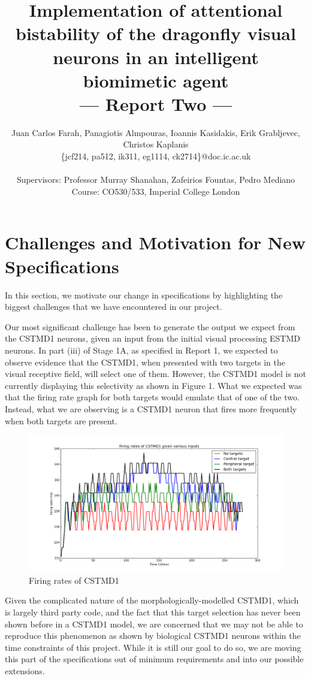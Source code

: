 \documentclass[a4paper,11pt]{article}
\title{Implementation of attentional bistability of the dragonfly visual neurons in an intelligent biomimetic agent\\\Large{--- Report Two ---}}
\author{Juan Carlos Farah, Panagiotis Almpouras, Ioannis Kasidakis, Erik Grabljevec, Christos Kaplanis\\
       \{jcf214, pa512, ik311, eg1114, ck2714\}@doc.ic.ac.uk\\ \\
       \small{Supervisors: Professor Murray Shanahan, Zafeirios Fountas, Pedro Mediano}\\
       \small{Course: CO530/533, Imperial College London}
}
\begin{document}
\maketitle
\section{Challenges and Motivation for New Specifications}
In this section, we motivate our change in specifications by highlighting the biggest challenges that we have encountered in our project. 

Our most significant challenge has been to generate the output we expect from the CSTMD1 neurons, given an input from the initial visual processing ESTMD neurons. In part (iii) of Stage 1A, as specified in Report 1, we expected to observe evidence that the CSTMD1, when presented with two targets in the visual receptive field, will select one of them. However, the CSTMD1 model is not currently displaying this selectivity as shown in Figure 1. What we expected was that the firing rate graph for both targets would emulate that of one of the two. Instead, what we are observing is a CSTMD1 neuron that fires more frequently when both targets are present.

	\begin{figure}[h]
	\begin{center}
	\includegraphics[scale = 0.3]{firingrates}
	\end{center}
	\caption{Firing rates of CSTMD1}
	\end{figure}	

Given the complicated nature of the morphologically-modelled CSTMD1, which is largely third party code, and the fact that this target selection has never been shown before in a CSTMD1 model, we are concerned that we may not be able to reproduce this phenomenon as shown by biological CSTMD1 neurons within the time constraints of this project. While it is still our goal to do so, we are moving this part of the specifications out of minimum requirements and into our possible extensions.
\end{document}
